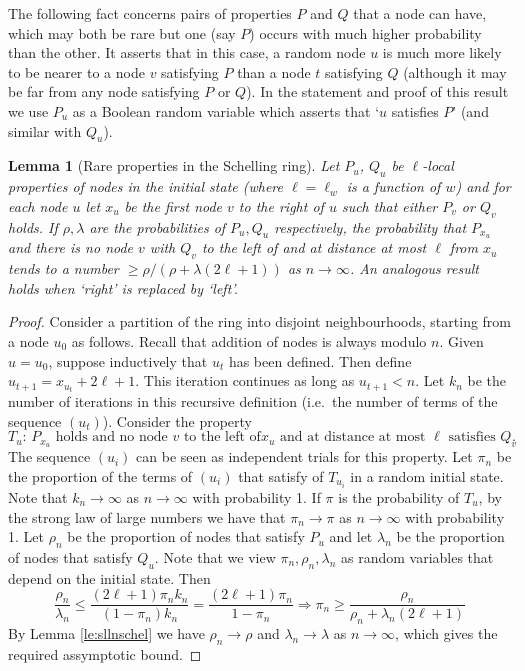 \documentclass[11pt]{article}
\theoremstyle{plain}
\newtheorem{lem}[thm]{Lemma}
\numberwithin{equation}{subsection}
\begin{document}
The following fact concerns pairs of properties
$P$ and $Q$ that a node can have, which may 
both be rare but one (say $P$) occurs with much higher probability than
the other. It asserts that in this case, a random node
$u$ is much more likely to be  nearer to a node $v$ satisfying $P$ than
a node $t$ satisfying $Q$ (although it may be far 
from any node satisfying $P$ or $Q$). In the statement and proof of this
result we use $P_u$ as a Boolean random variable which asserts that 
`$u$ satisfies $P$' (and similar with $Q_u$).


\begin{lem}[Rare properties in the Schelling ring]\label{le:rareprop}  
Let $P_u$, $Q_u$ be $\ell$-local properties of nodes in the initial state
(where $\ell=\ell_w$ is a function of $w$) and for
each node $u$ let
$x_u$ be the first node $v$ to the 
right of $u$ such that either $P_v$ or 
$Q_v$ holds. If $\rho,\lambda$ are the probabilities
of $P_u, Q_u$ respectively,
the probability that $P_{x_u}$ and
there is no node $v$ with $Q_v$ to the left of and at distance at most $\ell$
from $x_u$ tends to a number $\geq\rho/(\rho+\lambda(2\ell+1))$ as $n\to\infty$. 
An analogous result holds when `right' is replaced by `left'. 
\end{lem} 
\begin{proof}
Consider a partition of the ring into 
disjoint neighbourhoods, starting from a node $u_0$ 
as follows. Recall that addition of nodes is always modulo $n$.
Given $u=u_0$, suppose inductively that $u_t$ has been defined.
Then define $u_{t+1}=x_{u_t}+2\ell +1$. This iteration continues 
as long as $u_{t+1}< n$. Let $k_n$ be 
the number
of iterations in this recursive definition 
(i.e.\ the number of terms of the sequence $(u_t)$).
Consider the property
\[
\textrm{$T_u$:\ \ \ \ $P_{x_u}$ holds and no node $v$ to the left of
$x_u$ and at distance at most  $\ell$ satisfies $Q_v$}.
\]
The sequence $(u_i)$ can be seen as independent trials
for this property.
Let $\pi_n$ be the proportion of the terms of $(u_i)$ that satisfy of $T_{u_i}$
in a random initial state. 
Note that $k_n\to\infty$ as $n\to\infty$ with probability 1.
If $\pi$ is the probability of $T_u$, by the strong law of large numbers
we have that $\pi_n\to\pi$ as $n\to\infty$ with probability 1.
Let $\rho_n$ be the 
proportion of nodes that satisfy $P_u$ and let
$\lambda_n$ be the proportion of nodes that satisfy $Q_u$.
Note that we view $\pi_n, \rho_n, \lambda_n$ as random variables
that depend on the initial state. Then
\[
\frac{\rho_n}{\lambda_n}\leq 
\frac{(2\ell+1) \pi_n k_n}{(1-\pi_n)k_n}=
\frac{(2\ell+1) \pi_n}{1-\pi_n}\Rightarrow
\pi_n\geq \frac{\rho_n}{\rho_n+\lambda_n (2\ell+1)}
\]
By Lemma \ref{le:sllnschel} we have $\rho_n\to\rho$ and $\lambda_n\to\lambda$
as $n\to\infty$, which gives the required assymptotic bound.
\end{proof}
\end{document}
